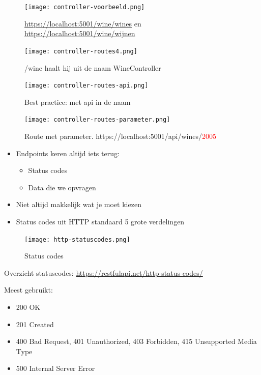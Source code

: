 \documentclass{article}
\begin{document}
\begin{figure}[H]
    \centering
    \texttt{[image: controller-voorbeeld.png]}
    \caption{\underline{https://localhost:5001/wine/wines} en \underline{https://localhost:5001/wine/wijnen}}
\end{figure}

\begin{figure}[H]
    \centering
    \texttt{[image: controller-routes4.png]}
    \caption{/wine haalt hij uit de naam WineController}
\end{figure}

\begin{figure}[H]
    \centering
    \texttt{[image: controller-routes-api.png]}
    \caption{Best practice: met api in de naam}
\end{figure}

\begin{figure}[H]
    \centering
    \texttt{[image: controller-routes-parameter.png]}
    \caption{Route met parameter. https://localhost:5001/api/wines/\textcolor{red}{2005}}
\end{figure}

\begin{itemize}
    \item Endpoints keren altijd iets terug:
    \begin{itemize}
        \item Status codes
        \item Data die we opvragen
    \end{itemize}
    \item Niet altijd makkelijk wat je moet kiezen
    \item Status codes uit HTTP standaard 5 grote verdelingen
\end{itemize}

\begin{figure}[H]
    \centering
    \texttt{[image: http-statuscodes.png]}
    \caption{Status codes}
\end{figure}

Overzicht statuscodes: \url{https://restfulapi.net/http-status-codes/}

Meest gebruikt: 

\begin{itemize}
    \item 200 OK
    \item 201 Created
    \item 400 Bad Request, 401 Unauthorized, 403 Forbidden, 415 Unsupported Media Type
    \item 500 Internal Server Error
\end{itemize}
\end{document}
